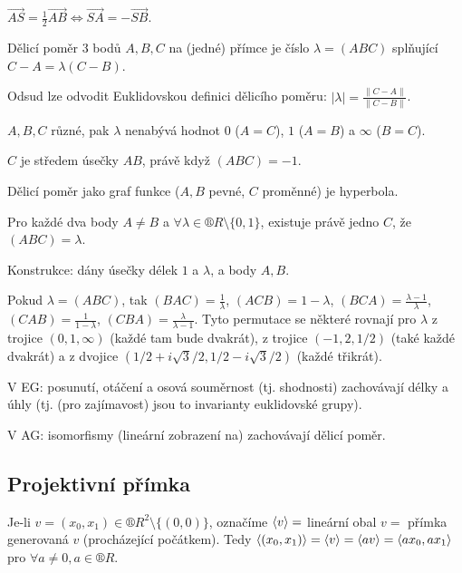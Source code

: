\documentclass[12pt]{article}					%
\begin{document}
\begin{poznamka}
	$\vec{AS} = \frac{1}{2} \vec{AB} \Leftrightarrow \vec{SA} = -\vec{SB}$.
\end{poznamka}

\begin{definice}
	Dělicí poměr 3 bodů $A, B, C$ na (jedné) přímce je číslo $λ = (ABC)$ splňující $C - A = λ(C - B)$.

	\begin{poznamkain}
		Odsud lze odvodit Euklidovskou definici dělicího poměru: $|λ| = \frac{\|C - A\|}{\|C - B\|}$.

		$A, B, C$ různé, pak $λ$ nenabývá hodnot $0$ ($A = C$), $1$ ($A = B$) a $∞$ ($B = C$).

		$C$ je středem úsečky $AB$, právě když $(ABC) = -1$.

		Dělicí poměr jako graf funkce ($A, B$ pevné, $C$ proměnné) je hyperbola.

		Pro každé dva body $A ≠ B$ a $\forall λ \in ®R \setminus \{0, 1\}$, existuje právě jedno $C$, že $(ABC) = λ$.

		Konstrukce: dány úsečky délek $1$ a $λ$, a body $A, B$.

		Pokud $λ = (ABC)$, tak $(BAC) = \frac{1}{λ}$, $(ACB) = 1 - λ$, $(BCA) = \frac{λ - 1}{λ}$, $(CAB) = \frac{1}{1 - λ}$, $(CBA) = \frac{λ}{λ - 1}$. Tyto permutace se některé rovnají pro $λ$ z trojice $(0, 1, ∞)$ (každé tam bude dvakrát), z trojice $(-1, 2, 1 / 2)$ (také každé dvakrát) a z dvojice $(1 / 2 + i\sqrt{3}/2, 1 / 2 - i\sqrt{3}/2)$ (každé třikrát).
	\end{poznamkain}
\end{definice}

\begin{poznamka}
	V EG: posunutí, otáčení a osová souměrnost (tj. shodnosti) zachovávají délky a úhly (tj. (pro zajímavost) jsou to invarianty euklidovské grupy).

	V AG: isomorfismy (lineární zobrazení na) zachovávají dělicí poměr.
\end{poznamka}

\subsection{Projektivní přímka}
\begin{definice}[Označení]
	Je-li $v = (x_0, x_1) \in ®R^2 \setminus \{(0, 0)\}$, označíme $\left\langle v\right\rangle =$ lineární obal $v =$ přímka generovaná $v$ (procházející počátkem). Tedy $\left\langle(x_0, x_1)\right\rangle = \left\langle v\right\rangle = \left\langle av\right\rangle = \left\langle ax_0, ax_1\right\rangle$ pro $\forall a ≠ 0, a \in ®R$.
\end{definice}
\end{document}
